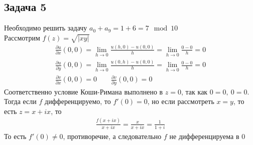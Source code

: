\subsection*{Задача 5}
	Необходимо решить задачу $a_0 + a_9 = 1 + 6 = 7 \mod 10$\\
	Рассмотрим $f(z) = \sqrt{|xy|}$
	\begin{gather*}
		\frac{\partial u}{\partial x}(0,0) = 
		\lim\limits_{h \to 0} \frac{u(h,0) - u(0,0)}{h} = 
		\lim\limits_{h \to 0} \frac{0 - 0}{h} = 0\\
		\frac{\partial u}{\partial y}(0,0) = 
		\lim\limits_{h \to 0} \frac{u(0,h) - u(0,0)}{h} = 
		\lim\limits_{h \to 0} \frac{0 - 0}{h} = 0\\
		\frac{\partial v}{\partial x}(0,0) = 0\qquad
		\frac{\partial v}{\partial y}(0,0) = 0		
	\end{gather*}
	Соответственно условие Коши-Римана выполнено в $z = 0$, так как $0 = 0,\ 0 = 0$. Тогда если $f$ дифференцируемо, то $f'(0) = 0$, но если рассмотреть $x = y$, то есть $z = x + ix$, то
	\begin{gather*}
		\frac{f(x + ix)}{x + ix} = 
		\frac{x}{x + ix} = 
		\frac{1}{1 + i}
	\end{gather*}
	То есть $f'(0) \ne 0$, противоречие, а следовательно $f$ не дифференцируема в $0$

	\begin{comment}
	Рассмотрим $f(z) = \sqrt{|xy|}$, заметим, что $f(0 + iy) = 0,\ f(x + 0i) = 0$ для всех $x, y$. Тогда частные производные обе зануляются в $0$ и условия Коши-Римана соблюдены $0 = 0,\ 0 = 0$. Но
	\begin{gather*}
		d f_0 = \lim\limits_{|z| \to 0} \frac{\sqrt{|xy|}}{\sqrt{x^2 + y^2}}\\
	\end{gather*}
	Не определен так как на прямой $x = y:\ \frac{|x|}{\sqrt{2}|x|} = \frac{1}{\sqrt{2}} \ne 0$.
	\end{comment}